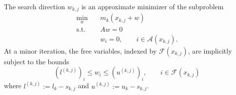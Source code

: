 \documentclass{article}
\numberwithin{equation}{section}
\newcommand{\calA}{{\mathcal{A}}}
\newcommand{\calF}{{\mathcal{F}}}
\theoremstyle{plain}
\begin{document}
	The search direction $w_{k,j}$ is an approximate minimizer of the subproblem
	\begin{subequations}\label{pb:minor_subpb}
		\begin{align}
			\min_w \quad & m_k(x_{k,j}+w) \\
			\text{s.t.} \quad & Aw=0 \label{subeq:minor_subpb_eq_cons} \\
			& w_i = 0, \qquad i \in \calA(x_{k,j}) \label{subeq:minor_subpb_fix_bounds}.
		\end{align}
	\end{subequations}
	At a minor iteration, the free variables, indexed by $\calF(x_{k,j})$, are implicitly subject to the bounds 
	\begin{equation}\label{subeq:minor_subpb_bounds}
		\left(l^{(k,j)}\right)_i \le w_i \le \left(u^{(k,j)}\right)_i, \qquad i \in \calF(x_{k,j})
	\end{equation}
	where $l^{(k,j)}:= l_k - s_{k,j}$ and $u^{(k,j)}:= u_k - s_{k,j}$.
\end{document}
